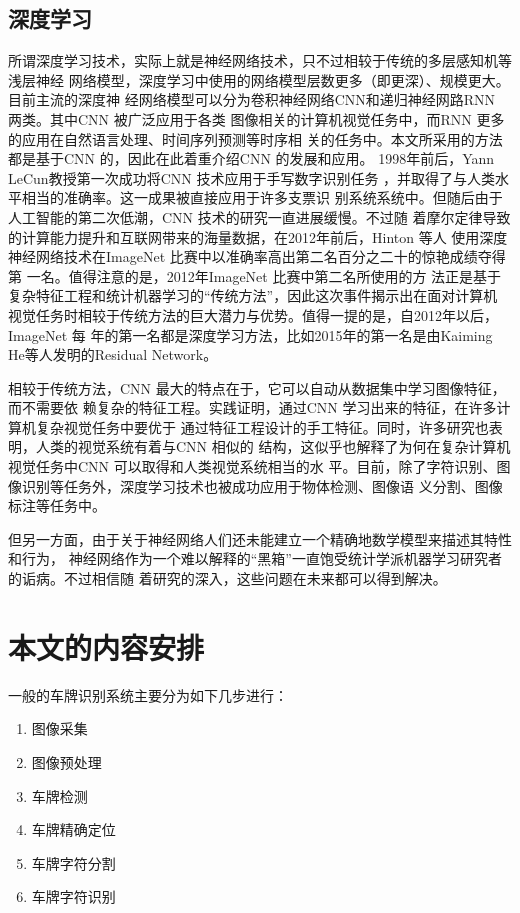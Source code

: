 \subsection{深度学习}

所谓深度学习技术，实际上就是神经网络技术，只不过相较于传统的多层感知机等浅层神经
网络模型，深度学习中使用的网络模型层数更多（即更深）、规模更大。目前主流的深度神
经网络模型可以分为卷积神经网络CNN和递归神经网路RNN 两类。其中CNN 被广泛应用于各类
图像相关的计算机视觉任务中，而RNN 更多的应用在自然语言处理、时间序列预测等时序相
关的任务中。本文所采用的方法都是基于CNN 的，因此在此着重介绍CNN 的发展和应用。
1998年前后，Yann LeCun教授第一次成功将CNN 技术应用于手写数字识别任务
\cite{LeCun:1990vp}，并取得了与人类水平相当的准确率。这一成果被直接应用于许多支票识
别系统系统中。但随后由于人工智能的第二次低潮，CNN 技术的研究一直进展缓慢。不过随
着摩尔定律导致的计算能力提升和互联网带来的海量数据，在2012年前后，Hinton 等人
使用深度神经网络技术在ImageNet 比赛中以准确率高出第二名百分之二十的惊艳成绩夺得第
一名\cite{Krizhevsky:2012wl}。值得注意的是，2012年ImageNet 比赛中第二名所使用的方
法正是基于复杂特征工程和统计机器学习的“传统方法”，因此这次事件揭示出在面对计算机
视觉任务时相较于传统方法的巨大潜力与优势。值得一提的是，自2012年以后，ImageNet 每
年的第一名都是深度学习方法，比如2015年的第一名是由Kaiming He等人发明的Residual
Network\cite{He:2015tt}。

相较于传统方法，CNN 最大的特点在于，它可以自动从数据集中学习图像特征，而不需要依
赖复杂的特征工程。实践证明，通过CNN 学习出来的特征，在许多计算机复杂视觉任务中要优于
通过特征工程设计的手工特征。同时，许多研究也表明，人类的视觉系统有着与CNN 相似的
结构，这似乎也解释了为何在复杂计算机视觉任务中CNN 可以取得和人类视觉系统相当的水
平。目前，除了字符识别、图像识别等任务外，深度学习技术也被成功应用于物体检测、图像语
义分割、图像标注等任务中。

但另一方面，由于关于神经网络人们还未能建立一个精确地数学模型来描述其特性和行为，
神经网络作为一个难以解释的“黑箱”一直饱受统计学派机器学习研究者的诟病。不过相信随
着研究的深入，这些问题在未来都可以得到解决。

\section{本文的内容安排}

一般的车牌识别系统主要分为如下几步进行：

\begin{enumerate}
\item 图像采集
\item 图像预处理
\item 车牌检测
\item 车牌精确定位
\item 车牌字符分割
\item 车牌字符识别
\end{enumerate}

